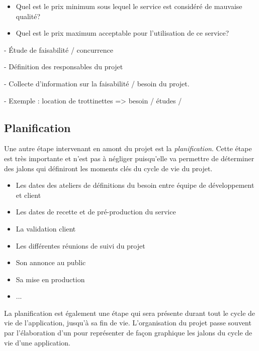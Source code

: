\begin{itemize}
	\item Quel est le prix minimum sous lequel le service est considéré de mauvaise qualité?
	\item Quel est le prix maximum acceptable pour l'utilisation de ce service?
\end{itemize}

- Étude de faisabilité / concurrence

- Définition des responsables du projet

- Collecte d'information sur la faisabilité / besoin du projet.

- Exemple : location de trottinettes => besoin / études /



\subsection{Planification}

Une autre étape intervenant en amont du projet est la \emph{planification}. Cette étape est très importante et n'est pas à négliger puisqu'elle va permettre de déterminer des jalons qui définiront les moments clés du cycle de vie du projet.

\begin{itemize}
	\item Les dates des ateliers de définitions du besoin entre équipe de développement et client
	\item Les dates de recette et de pré-production du service
	\item La validation client
	\item Les différentes réunions de suivi du projet 
	\item Son annonce au public
	\item Sa mise en production
	\item ...
\end{itemize}

La planification est également une étape qui sera présente durant tout le cycle de vie de l'application, jusqu’à sa fin de vie. L'organisation du projet passe souvent par l'élaboration d'un  pour représenter de façon graphique les jalons du cycle de vie d'une application.

